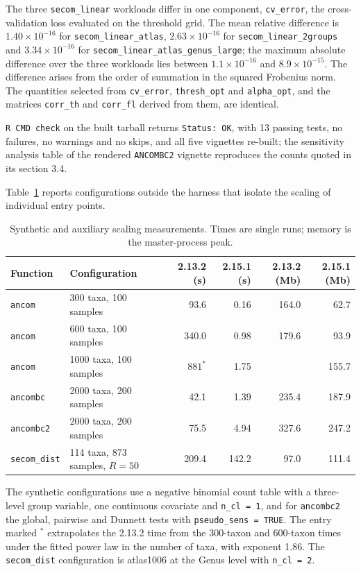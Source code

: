 \documentclass[11pt]{article}
\newcommand{\code}[1]{\texttt{#1}}
\begin{document}
The three \code{secom\_linear} workloads differ in one component,
\code{cv\_error}, the cross-validation loss evaluated on the threshold grid.
The mean relative difference is $1.40 \times 10^{-16}$ for
\code{secom\_linear\_atlas}, $2.63 \times 10^{-16}$ for
\code{secom\_linear\_2groups} and $3.34 \times 10^{-16}$ for
\code{secom\_linear\_atlas\_genus\_large}; the maximum absolute difference over
the three workloads lies between $1.1 \times 10^{-16}$ and
$8.9 \times 10^{-15}$. The difference arises from the order of summation in the
squared Frobenius norm. The quantities selected from \code{cv\_error},
\code{thresh\_opt} and \code{alpha\_opt}, and the matrices \code{corr\_th} and
\code{corr\_fl} derived from them, are identical.

\code{R CMD check} on the built tarball returns \code{Status: OK}, with 13
passing tests, no failures, no warnings and no skips, and all five vignettes
re-built; the sensitivity analysis table of the rendered \code{ANCOMBC2}
vignette reproduces the counts quoted in its section 3.4.

Table~\ref{tab:scaling} reports configurations outside the harness that isolate
the scaling of individual entry points.

\begin{table}[htbp]
\centering
\small
\caption{Synthetic and auxiliary scaling measurements. Times are single runs;
memory is the master-process peak.}
\label{tab:scaling}
\begin{tabular}{l l r r r r}
\toprule
Function & Configuration & 2.13.2 (s) & 2.15.1 (s) & 2.13.2 (Mb) &
2.15.1 (Mb) \\
\midrule
\code{ancom} & 300 taxa, 100 samples & 93.6 & 0.16 & 164.0 & 62.7 \\
\code{ancom} & 600 taxa, 100 samples & 340.0 & 0.98 & 179.6 & 93.9 \\
\code{ancom} & 1000 taxa, 100 samples & $881^{*}$ & 1.75 & & 155.7 \\
\code{ancombc} & 2000 taxa, 200 samples & 42.1 & 1.39 & 235.4 & 187.9 \\
\code{ancombc2} & 2000 taxa, 200 samples & 75.5 & 4.94 & 327.6 & 247.2 \\
\code{secom\_dist} & 114 taxa, 873 samples, $R = 50$ & 209.4 & 142.2 & 97.0 &
111.4 \\
\bottomrule
\end{tabular}
\end{table}

The synthetic configurations use a negative binomial count table with a
three-level group variable, one continuous covariate and \code{n\_cl = 1}, and
for \code{ancombc2} the global, pairwise and Dunnett tests with
\code{pseudo\_sens = TRUE}. The entry marked $^{*}$ extrapolates the 2.13.2
time from the 300-taxon and 600-taxon times under the fitted power law in the
number of taxa, with exponent 1.86. The \code{secom\_dist} configuration is
atlas1006 at the Genus level with \code{n\_cl = 2}.
\end{document}
